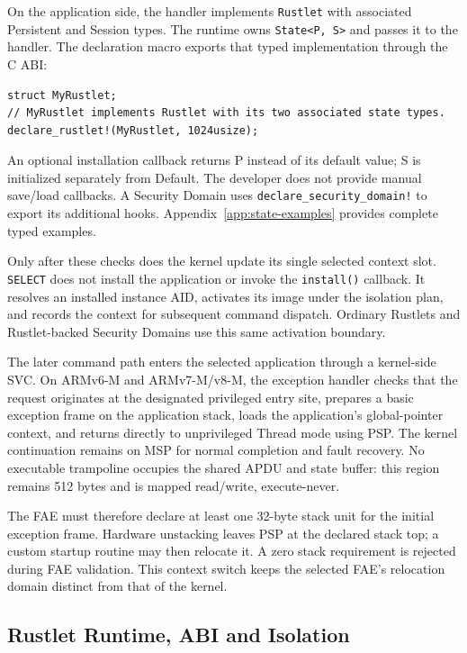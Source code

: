On the application side, the handler implements \texttt{Rustlet} with
associated Persistent and Session types. The runtime owns
\texttt{State<P, S>} and passes it to the handler. The declaration macro
exports that typed implementation through the C ABI:

\begin{verbatim}
struct MyRustlet;
// MyRustlet implements Rustlet with its two associated state types.
declare_rustlet!(MyRustlet, 1024usize);
\end{verbatim}

An optional installation callback returns P instead of its default value;
S is initialized separately from Default. The developer does not provide
manual save/load callbacks. A Security Domain uses
\texttt{declare\_security\_domain!} to export its additional hooks.
Appendix~\ref{app:state-examples} provides complete typed examples.

Only after these checks does the kernel update its single selected
context slot. \texttt{SELECT} does not install the application or invoke
the \texttt{install()} callback. It resolves an installed instance AID,
activates its image under the isolation plan, and records the context for
subsequent command dispatch. Ordinary Rustlets and Rustlet-backed Security
Domains use this same activation boundary.

The later command path enters the selected application through a
kernel-side SVC. On ARMv6-M and ARMv7-M/v8-M, the exception handler checks
that the request originates at the designated privileged entry site,
prepares a basic exception frame on the application stack, loads the
application's global-pointer context, and returns directly to
unprivileged Thread mode using PSP. The kernel continuation remains on
MSP for normal completion and fault recovery. No executable trampoline
occupies the shared APDU and state buffer: this region remains 512 bytes
and is mapped read/write, execute-never.

The FAE must therefore declare at least one 32-byte stack unit for the
initial exception frame. Hardware unstacking leaves PSP at the declared
stack top; a custom startup routine may then relocate it. A zero stack
requirement is rejected during FAE validation. This context switch keeps
the selected FAE's relocation domain distinct from that of the kernel.

\subsection{Rustlet Runtime, ABI and Isolation}
\label{sec:impl-rustlet-runtime}

